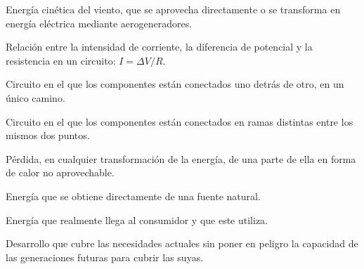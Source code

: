 \begin{vocabulary}
    Energía cinética del viento, que se aprovecha directamente o se transforma en energía eléctrica mediante aerogeneradores.
\end{vocabulary}

\begin{vocabulary}
    Relación entre la intensidad de corriente, la diferencia de potencial y la resistencia en un circuito: \(I = \Delta V / R\).
\end{vocabulary}

\begin{vocabulary}
    Circuito en el que los componentes están conectados uno detrás de otro, en un único camino.
\end{vocabulary}

\begin{vocabulary}
    Circuito en el que los componentes están conectados en ramas distintas entre los mismos dos puntos.
\end{vocabulary}

\begin{vocabulary}
    Pérdida, en cualquier transformación de la energía, de una parte de ella en forma de calor no aprovechable.
\end{vocabulary}

\begin{vocabulary}
    Energía que se obtiene directamente de una fuente natural.
\end{vocabulary}

\begin{vocabulary}
    Energía que realmente llega al consumidor y que este utiliza.
\end{vocabulary}

\begin{vocabulary}
    Desarrollo que cubre las necesidades actuales sin poner en peligro la capacidad de las generaciones futuras para cubrir las suyas.
\end{vocabulary}
